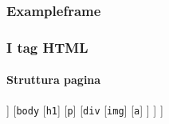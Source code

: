 \begin{exerciseframe}
    \frametitle{Exampleframe}
\end{exerciseframe}


\begin{contentframe}
    \frametitle{I tag HTML}
    \framesubtitle{Struttura pagina}

    \centering
    \smartarttree
        [\texttt{html}
            [\texttt{head}
            [\texttt{title}]
                [\texttt{meta charset}]
                [\texttt{meta author}]
            ]
            [\texttt{body}
                [\texttt{h1}]
                [\texttt{p}]
                [\texttt{div}
                    [\texttt{img}]
                    [\texttt{a}]
                ]
            ]
        ]
        
\end{contentframe}




